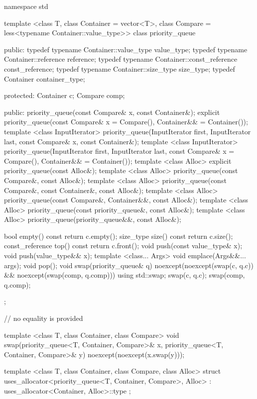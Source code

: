 \begin{codeblock}
namespace std {
  template <class T, class Container = vector<T>,
    class Compare = less<typename Container::value_type>>
  class priority_queue {
  public:
    typedef typename Container::value_type            value_type;
    typedef typename Container::reference             reference;
    typedef typename Container::const_reference       const_reference;
    typedef typename Container::size_type             size_type;
    typedef          Container                        container_type;

  protected:
    Container c;
    Compare comp;

  public:
    priority_queue(const Compare& x, const Container&);
    explicit priority_queue(const Compare& x = Compare(), Container&& = Container());
    template <class InputIterator>
      priority_queue(InputIterator first, InputIterator last,
             const Compare& x, const Container&);
    template <class InputIterator>
      priority_queue(InputIterator first, InputIterator last,
             const Compare& x = Compare(), Container&& = Container());
    template <class Alloc> explicit priority_queue(const Alloc&);
    template <class Alloc> priority_queue(const Compare&, const Alloc&);
    template <class Alloc> priority_queue(const Compare&, const Container&, const Alloc&);
    template <class Alloc> priority_queue(const Compare&, Container&&, const Alloc&);
    template <class Alloc> priority_queue(const priority_queue&, const Alloc&);
    template <class Alloc> priority_queue(priority_queue&&, const Alloc&);

    bool      empty() const       { return c.empty(); }
    size_type size()  const       { return c.size(); }
    const_reference   top() const { return c.front(); }
    void push(const value_type& x);
    void push(value_type&& x);
    template <class... Args> void emplace(Args&&... args);
    void pop();
    void swap(priority_queue& q) noexcept(noexcept(swap(c, q.c)) &&
                                          noexcept(swap(comp, q.comp)))
      { using std::swap; swap(c, q.c); swap(comp, q.comp); }
  };

  // no equality is provided

  template <class T, class Container, class Compare>
    void swap(priority_queue<T, Container, Compare>& x,
              priority_queue<T, Container, Compare>& y) noexcept(noexcept(x.swap(y)));

  template <class T, class Container, class Compare, class Alloc>
    struct uses_allocator<priority_queue<T, Container, Compare>, Alloc>
      : uses_allocator<Container, Alloc>::type { };
}
\end{codeblock}

